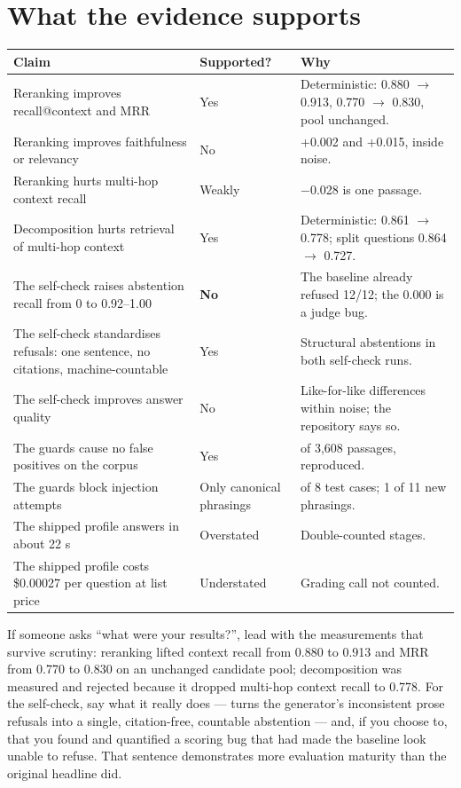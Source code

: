\section{What the evidence supports}

\begin{longtable}{@{}>{\raggedright\arraybackslash}p{6.4cm}>{\raggedright\arraybackslash}p{2.2cm}>{\raggedright\arraybackslash}p{7.0cm}@{}}
\toprule
\textbf{Claim} & \textbf{Supported?} & \textbf{Why}\\
\midrule
\endhead
Reranking improves recall@context and MRR & Yes & Deterministic: 0.880 $\rightarrow$ 0.913, 0.770 $\rightarrow$ 0.830, pool unchanged.\\
Reranking improves faithfulness or relevancy & No & +0.002 and +0.015, inside noise.\\
Reranking hurts multi-hop context recall & Weakly & $-$0.028 is one passage.\\
Decomposition hurts retrieval of multi-hop context & Yes & Deterministic: 0.861 $\rightarrow$ 0.778; split questions 0.864 $\rightarrow$ 0.727.\\
The self-check raises abstention recall from 0 to 0.92--1.00 & \textbf{No} & The baseline already refused 12/12; the 0.000 is a judge bug.\\
The self-check standardises refusals: one sentence, no citations, machine-countable & Yes & Structural abstentions in both self-check runs.\\
The self-check improves answer quality & No & Like-for-like differences within noise; the repository says so.\\
The guards cause no false positives on the corpus & Yes & 0 of 3,608 passages, reproduced.\\
The guards block injection attempts & Only canonical phrasings & 8 of 8 test cases; 1 of 11 new phrasings.\\
The shipped profile answers in about 22 s & Overstated & Double-counted stages.\\
The shipped profile costs \$0.00027 per question at list price & Understated & Grading call not counted.\\
\bottomrule
\end{longtable}

\begin{interview}
If someone asks \enquote{what were your results?}, lead with the measurements that survive scrutiny: reranking lifted context recall from 0.880 to 0.913 and MRR from 0.770 to 0.830 on an unchanged candidate pool; decomposition was measured and rejected because it dropped multi-hop context recall to 0.778. For the self-check, say what it really does --- turns the generator's inconsistent prose refusals into a single, citation-free, countable abstention --- and, if you choose to, that you found and quantified a scoring bug that had made the baseline look unable to refuse. That sentence demonstrates more evaluation maturity than the original headline did.
\end{interview}
